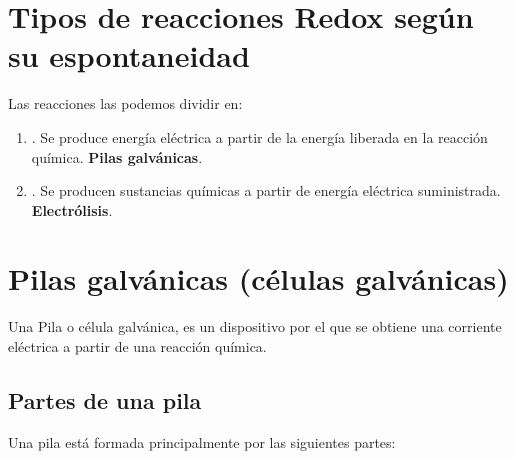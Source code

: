 \section{Tipos de reacciones Redox según su espontaneidad}\label{sec:tipos-de-reacciones-redox-segun-su-espontaneidad}

Las reacciones las podemos dividir en:

\begin{enumerate}[label=\numberballmDarkTeal]
        \item {}.
        Se produce energía eléctrica a partir de la energía liberada en la reacción química. \textbf{Pilas galvánicas}.
        \item {}.
        Se producen sustancias químicas a partir de energía eléctrica suministrada. \textbf{Electrólisis}.
\end{enumerate}


\section{Pilas galvánicas (células galvánicas)}\label{sec:pilas-galvanicas-(celulas-galvanicas)}

Una Pila o célula galvánica, es un dispositivo por el que se obtiene una corriente eléctrica a partir de una reacción química.


\subsection{Partes de una pila}

Una pila está formada principalmente por las siguientes partes:

